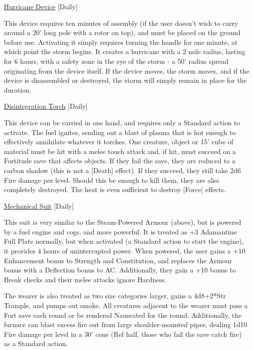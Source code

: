 \noindent\underline{Hurricane Device} [Daily]

\noindent This device requires ten minutes of assembly (if the user doesn't wish to carry around a 20' long pole with a rotor on top), and must be placed on the ground before use. Activating it simply requires turning the handle for one minute, at which point the storm begins. It creates a hurricane with a 2 mile radius, lasting for 6 hours, with a safety zone in the eye of the storm - a 50' radius spread originating from the device itself. If the device moves, the storm moves, and if the device is disassembled or destroyed, the storm will simply remain in place for the duration.

\medskip\noindent\underline{Disintegration Torch} [Daily]

\noindent This device can be carried in one hand, and requires only a Standard action to activate. The fuel ignites, sending out a blast of plasma that is hot enough to effectively annihilate whatever it torches. One creature, object or 15' cube of material must be hit with a melee touch attack and, if hit, must succeed on a Fortitude save that affects objects. If they fail the save, they are reduced to a carbon shadow (this is not a [Death] effect). If they succeed, they still take 2d6 Fire damage per level. Should this be enough to kill them, they are also completely destroyed. The heat is even sufficient to destroy [Force] effects.

\medskip\noindent\underline{Mechanical Suit} [Daily]

\noindent This suit is very similar to the Steam-Powered Armour (above), but is powered by a fuel engine and cogs, and more powerful. It is treated as +3 Adamantine Full Plate normally, but when activated (a Standard action to start the engine), it provides 4 hours of uninterrupted power. When powered, the user gains a +10 Enhancement bonus to Strength and Constitution, and replaces the Armour bonus with a Deflection bonus to AC. Additionally, they gain a +10 bonus to Break checks and their melee attacks ignore Hardness.

\smallskip\noindent The wearer is also treated as two size categories larger, gains a 4d8+2*Str Trample, and pumps out smoke. All creatures adjacent to the wearer must pass a Fort save each round or be rendered Nauseated for the round. Additionally, the furnace can blast excess fire out from large shoulder-mounted pipes, dealing 1d10 Fire damage per level in a 30' cone (Ref half, those who fail the save catch fire) as a Standard action.

